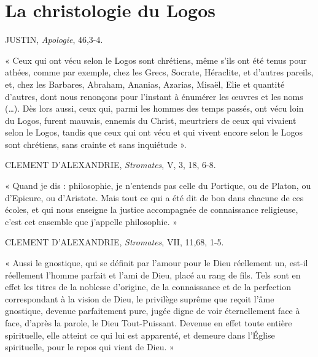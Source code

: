 \hypertarget{la-christologie-du-logos}{%
\section{La christologie du Logos}\label{la-christologie-du-logos}}


JUSTIN, \emph{Apologie}, 46,3-4.

« Ceux qui ont vécu selon le Logos sont chrétiens, même s'ils ont été
tenus pour athées, comme par exemple, chez les Grecs, Socrate,
Héraclite, et d'autres pareils, et, chez les Barbares, Abraham, Ananias,
Azarias, Misaël, Elie et quantité d'autres, dont nous renonçons pour
l'instant à énumérer les œuvres et les noms (\ldots). Dès lors aussi,
ceux qui, parmi les hommes des temps passés, ont vécu loin du Logos,
furent mauvais, ennemis du Christ, meurtriers de ceux qui vivaient selon
le Logos, tandis que ceux qui ont vécu et qui vivent encore selon le
Logos sont chrétiens, sans crainte et sans inquiétude ».

CLEMENT D'ALEXANDRIE, \emph{Stromates}, V, 3, 18, 6-8.

« Quand je dis : philosophie, je n'entends pas celle du Portique, ou de
Platon, ou d'Epicure, ou d'Aristote. Mais tout ce qui a été dit de bon
dans chacune de ces écoles, et qui nous enseigne la justice accompagnée
de connaissance religieuse, c'est cet ensemble que j'appelle
philosophie. »

CLEMENT D'ALEXANDRIE, \emph{Stromates}, VII, 11,68, 1-5.

« Aussi le gnostique, qui se définit par l'amour pour le Dieu réellement
un, est-il réellement l'homme parfait et l'ami de Dieu, placé au rang de
fils. Tels sont en effet les titres de la noblesse d'origine, de la
connaissance et de la perfection correspondant à la vision de Dieu, le
privilège suprême que reçoit l'âme gnostique, devenue parfaitement pure,
jugée digne de voir éternellement face à face, d'après la parole, le
Dieu Tout-Puissant. Devenue en effet toute entière spirituelle, elle
atteint ce qui lui est apparenté, et demeure dans l'Église spirituelle,
pour le repos qui vient de Dieu. »


